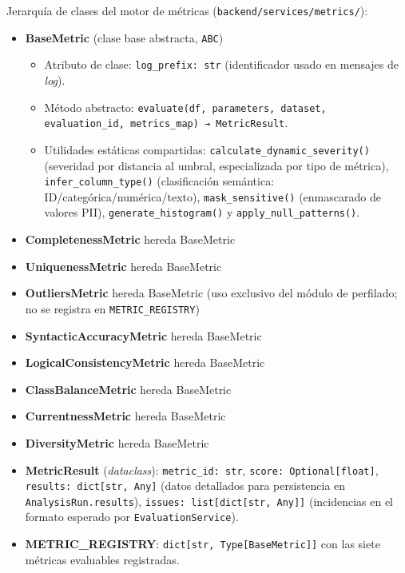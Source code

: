 Jerarquía de clases del motor de métricas
(\texttt{backend/services/metrics/}):

\begin{itemize}
  \item \textbf{BaseMetric} (clase base abstracta, \texttt{ABC})
    \begin{itemize}
      \item Atributo de clase: \texttt{log\_prefix: str} (identificador
        usado en mensajes de \emph{log}).
      \item Método abstracto:
        \texttt{evaluate(df, parameters, dataset, evaluation\_id, metrics\_map)
        → MetricResult}.
      \item Utilidades estáticas compartidas:
        \texttt{calculate\_dynamic\_severity()} (severidad por distancia al
        umbral, especializada por tipo de métrica),
        \texttt{infer\_column\_type()} (clasificación semántica:
        ID/categórica/numérica/texto), \texttt{mask\_sensitive()}
        (enmascarado de valores \ac{PII}),
        \texttt{generate\_histogram()} y \texttt{apply\_null\_patterns()}.
    \end{itemize}
  \item \textbf{CompletenessMetric} hereda BaseMetric
  \item \textbf{UniquenessMetric} hereda BaseMetric
  \item \textbf{OutliersMetric} hereda BaseMetric (uso exclusivo del módulo
    de perfilado; no se registra en \texttt{METRIC\_REGISTRY})
  \item \textbf{SyntacticAccuracyMetric} hereda BaseMetric
  \item \textbf{LogicalConsistencyMetric} hereda BaseMetric
  \item \textbf{ClassBalanceMetric} hereda BaseMetric
  \item \textbf{CurrentnessMetric} hereda BaseMetric
  \item \textbf{DiversityMetric} hereda BaseMetric
  \item \textbf{MetricResult} (\emph{dataclass}): \texttt{metric\_id: str},
    \texttt{score: Optional[float]}, \texttt{results: dict[str, Any]}
    (datos detallados para persistencia en \texttt{AnalysisRun.results}),
    \texttt{issues: list[dict[str, Any]]} (incidencias en el formato
    esperado por \texttt{EvaluationService}).
  \item \textbf{METRIC\_REGISTRY}: \texttt{dict[str, Type[BaseMetric]]} con
    las siete métricas evaluables registradas.
\end{itemize}


